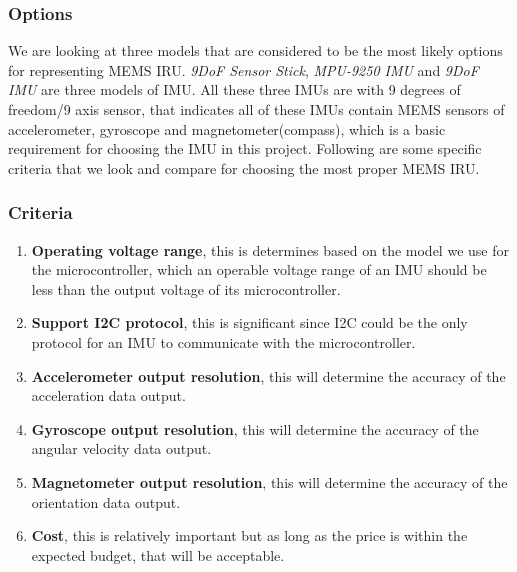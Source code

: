 \subsubsection{Options}
We are looking at three models that are considered to be the most likely options for representing MEMS IRU. \textit{9DoF Sensor Stick}\cite{sensorStick}, \textit{MPU-9250 IMU}\cite{mpu9250} and \textit{9DoF IMU}\cite{9dof} are three models of IMU. All these three IMUs are with 9 degrees of freedom/9 axis sensor, that indicates all of these IMUs contain MEMS sensors of accelerometer, gyroscope and magnetometer(compass), which is a basic requirement for choosing the IMU in this project. Following are some specific criteria that we look and compare for choosing the most proper MEMS IRU.\\

\subsubsection{Criteria}
\begin{enumerate}
	\item \textbf{Operating voltage range},  this is determines based on the model we use for the microcontroller, which an operable voltage range of an IMU should be less than the output voltage of its microcontroller.
	\item \textbf{Support I2C protocol}, this is significant since I2C could be the only protocol for an IMU to communicate with the microcontroller.
	\item \textbf{Accelerometer output resolution}, this will determine the accuracy of the acceleration data output.
	\item \textbf{Gyroscope output resolution}, this will determine the accuracy of the angular velocity data output.
	\item \textbf{Magnetometer output resolution}, this will determine the accuracy of the orientation data output.
	\item \textbf{Cost}, this is relatively important but as long as the price is within the expected budget, that will be acceptable.\\
\end{enumerate}

